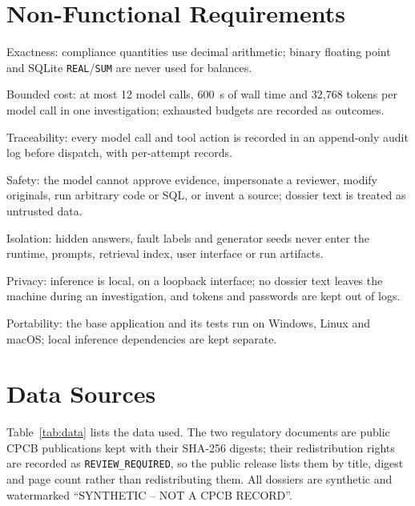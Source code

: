 \section{Non-Functional Requirements}
\begin{description}[itemsep=1pt,font=\normalfont\bfseries]
\item[NFR1] Exactness: compliance quantities use decimal arithmetic; binary floating point and
SQLite \texttt{REAL}/\texttt{SUM} are never used for balances.
\item[NFR2] Bounded cost: at most 12 model calls, 600~s of wall time and 32{,}768 tokens per model
call in one investigation; exhausted budgets are recorded as outcomes.
\item[NFR3] Traceability: every model call and tool action is recorded in an append-only audit
log before dispatch, with per-attempt records.
\item[NFR4] Safety: the model cannot approve evidence, impersonate a reviewer, modify originals,
run arbitrary code or SQL, or invent a source; dossier text is treated as untrusted data.
\item[NFR5] Isolation: hidden answers, fault labels and generator seeds never enter the runtime,
prompts, retrieval index, user interface or run artifacts.
\item[NFR6] Privacy: inference is local, on a loopback interface; no dossier text leaves the
machine during an investigation, and tokens and passwords are kept out of logs.
\item[NFR7] Portability: the base application and its tests run on Windows, Linux and macOS;
local inference dependencies are kept separate.
\end{description}

\section{Data Sources}
Table~\ref{tab:data} lists the data used. The two regulatory documents are public CPCB
publications kept with their SHA-256 digests; their redistribution rights are recorded as
\texttt{REVIEW\_REQUIRED}, so the public release lists them by title, digest and page count rather
than redistributing them. All dossiers are synthetic and watermarked ``SYNTHETIC -- NOT A CPCB
RECORD''.

